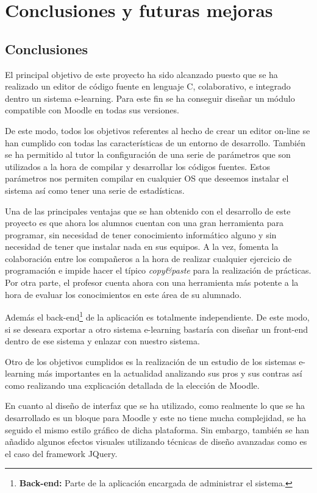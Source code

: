 \chapter[Conclusiones y futuras mejoras]{\label{}
Conclusiones y futuras mejoras}

\section{Conclusiones}

El principal objetivo de este proyecto ha sido alcanzado puesto que se ha realizado un editor de código fuente en lenguaje C, colaborativo, e integrado dentro un sistema e-learning. Para este fin se ha conseguir diseñar un módulo compatible con Moodle en todas sus versiones.

De este modo, todos los objetivos referentes al hecho de crear un editor on-line se han cumplido con todas las características de un entorno de desarrollo. También se ha permitido al tutor la configuración de una serie de parámetros que son utilizados a la hora de compilar y desarrollar los códigos fuentes. Estos parámetros nos permiten compilar en cualquier OS que deseemos instalar el sistema así como tener una serie de estadísticas.

Una de las principales ventajas que se han obtenido con el desarrollo de este proyecto es que ahora los alumnos cuentan con una gran herramienta para programar, sin necesidad de tener conocimiento informático alguno y sin necesidad de tener que instalar nada en sus equipos. A la vez, fomenta la colaboración entre los compañeros a la hora de realizar cualquier ejercicio de programación e impide hacer el típico \emph{copy\&paste} para la realización de prácticas. Por otra parte, el profesor cuenta ahora con una herramienta más potente a la hora de evaluar los conocimientos en este área de su alumnado.

Además el back-end\footnote{\textbf{Back-end: }Parte de la aplicación encargada de administrar el sistema.} de la aplicación es totalmente independiente. De este modo, si se deseara exportar a otro sistema e-learning bastaría con diseñar un front-end dentro de ese sistema y enlazar con nuestro sistema. 

Otro de los objetivos cumplidos es la realización de un estudio de los sistemas e-learning más importantes en la actualidad analizando sus pros y sus contras así como realizando una explicación detallada de la elección de Moodle.

En cuanto al diseño de interfaz que se ha utilizado, como realmente lo que se ha desarrollado es un bloque para Moodle y este no tiene mucha complejidad, se ha seguido el mismo estilo gráfico de dicha plataforma. Sin embargo, también se han añadido algunos efectos visuales utilizando técnicas de diseño avanzadas como es el caso del framework JQuery.

